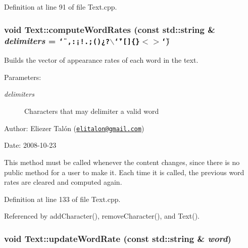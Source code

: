 Definition at line 91 of file Text.cpp.\hypertarget{class_text_e954a35628c72537e2ee5ca6e9609ac1}{
\subsubsection[computeWordRates]{\setlength{\rightskip}{0pt plus 5cm}void Text::computeWordRates (const std::string \& {\em delimiters} = {\tt \char`\"{}~,:¡!.;()¿?$\backslash$\char`\"{}'\mbox{[}\mbox{]}\{\}$<$$>$\char`\"{}})}}
\label{class_text_e954a35628c72537e2ee5ca6e9609ac1}


Builds the vector of appearance rates of each word in the text. 

\begin{Desc}
\item[Parameters:]
\begin{description}
\item[{\em delimiters}]Characters that may delimiter a valid word\end{description}
\end{Desc}
\begin{Desc}
\item[Author:]Eliezer Talón (\href{mailto:elitalon@gmail.com}{\tt elitalon@gmail.com}) \end{Desc}
\begin{Desc}
\item[Date:]2008-10-23\end{Desc}
This method must be called whenever the content changes, since there is no public method for a user to make it. Each time it is called, the previous word rates are cleared and computed again. 

Definition at line 133 of file Text.cpp.

Referenced by addCharacter(), removeCharacter(), and Text().\hypertarget{class_text_5ab8f9bfa566de537a167991fe10eff5}{
\subsubsection[updateWordRate]{\setlength{\rightskip}{0pt plus 5cm}void Text::updateWordRate (const std::string \& {\em word})}}
\label{class_text_5ab8f9bfa566de537a167991fe10eff5}


